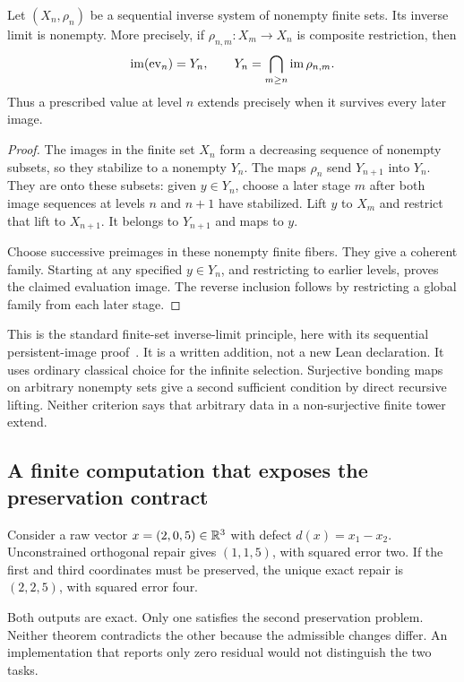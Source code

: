 \begin{proposition}\label{KS58}
Let \((X_n,\rho_n)\) be a sequential inverse system of nonempty finite sets. Its inverse limit is nonempty. More precisely, if \(\rho_{n,m}:X_m\to X_n\) is composite restriction, then
\[
 \operatorname{im}(\operatorname{ev}_n)=Y_n,
 \qquad Y_n=\bigcap_{m\ge n}\operatorname{im}\rho_{n,m}.
\]
Thus a prescribed value at level \(n\) extends precisely when it survives every later image.
\end{proposition}
\begin{proof}
The images in the finite set \(X_n\) form a decreasing sequence of nonempty subsets, so they stabilize to a nonempty \(Y_n\). The maps \(\rho_n\) send \(Y_{n+1}\) into \(Y_n\). They are onto these subsets: given \(y\in Y_n\), choose a later stage \(m\) after both image sequences at levels \(n\) and \(n+1\) have stabilized. Lift \(y\) to \(X_m\) and restrict that lift to \(X_{n+1}\). It belongs to \(Y_{n+1}\) and maps to \(y\).

Choose successive preimages in these nonempty finite fibers. They give a coherent family. Starting at any specified \(y\in Y_n\), and restricting to earlier levels, proves the claimed evaluation image. The reverse inclusion follows by restricting a global family from each later stage.
\end{proof}
This is the standard finite-set inverse-limit principle, here with its sequential persistent-image proof~\cite{stacks-limits}. It is a written addition, not a new Lean declaration. It uses ordinary classical choice for the infinite selection. Surjective bonding maps on arbitrary nonempty sets give a second sufficient condition by direct recursive lifting. Neither criterion says that arbitrary data in a non-surjective finite tower extend.

\subsection{A finite computation that exposes the preservation contract}
Consider a raw vector \(x=(2,0,5)\in\mathbb R^3\) with defect \(d(x)=x_1-x_2\). Unconstrained orthogonal repair gives \((1,1,5)\), with squared error two. If the first and third coordinates must be preserved, the unique exact repair is \((2,2,5)\), with squared error four.

Both outputs are exact. Only one satisfies the second preservation problem. Neither theorem contradicts the other because the admissible changes differ. An implementation that reports only zero residual would not distinguish the two tasks.

